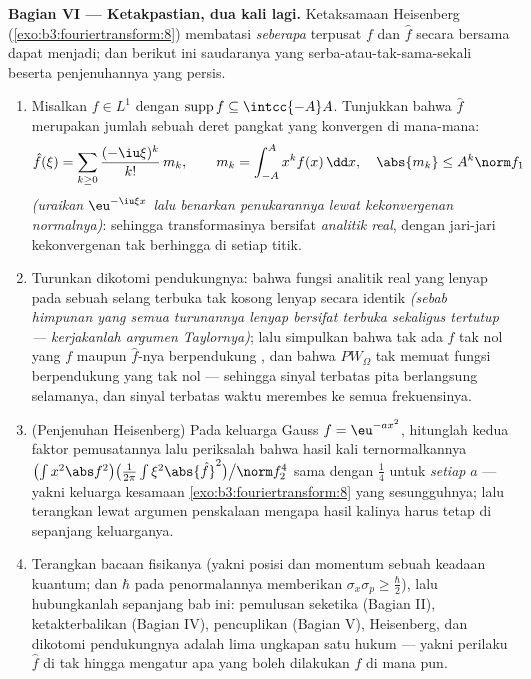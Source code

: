 \begin{problem}[{Soal akhir pekan --- $\partial_tu =
\partial^2_{xx}u$, yang diselesaikan sampai tuntas}]
\medskip
\noindent\textbf{Bagian VI --- Ketakpastian, dua kali lagi.}
Ketaksamaan Heisenberg (\cref{exo:b3:fouriertransform:8})
membatasi \emph{seberapa} terpusat $f$ dan $\hat f$ secara bersama
dapat menjadi; dan berikut ini saudaranya yang serba-atau-tak-sama-sekali beserta
penjenuhannya yang persis.
\begin{enumerate}[resume]
  \item Misalkan $f \in L^1$ dengan $\operatorname{supp}f \subseteq
        \intcc{-A}A$. Tunjukkan bahwa $\hat f$ merupakan jumlah sebuah
        deret pangkat yang konvergen di mana-mana:
        \[
        \hat f(\xi) = \sum_{k\geq0}\frac{(-\iu\xi)^k}{k!}
        \,m_k, \qquad m_k = \int_{-A}^{A}x^kf(x)\,\dd x,
        \quad \abs{m_k} \leq A^k\norm f_1
        \]
        \emph{(uraikan $\eu^{-\iu\xi x}$ lalu benarkan
        penukarannya lewat kekonvergenan normalnya)}: sehingga transformasinya
        bersifat \emph{analitik real}, dengan jari-jari kekonvergenan tak
        berhingga di setiap titik.
  \item Turunkan dikotomi pendukungnya: bahwa fungsi analitik real
        yang lenyap pada sebuah selang terbuka tak kosong
        lenyap secara identik \emph{(sebab himpunan yang semua
        turunannya lenyap bersifat terbuka sekaligus tertutup --- kerjakanlah
        argumen Taylornya)}; lalu simpulkan bahwa tak ada $f$ tak nol yang
        $f$ maupun $\hat f$-nya berpendukung , dan
        bahwa $PW_\Omega$ tak memuat fungsi berpendukung 
        yang tak nol --- sehingga sinyal terbatas pita berlangsung
        selamanya, dan sinyal terbatas waktu merembes ke semua
        frekuensinya.
  \item (Penjenuhan Heisenberg) Pada keluarga Gauss $f
        = \eu^{-ax^2}$, hitunglah kedua faktor pemusatannya
        lalu periksalah bahwa hasil kali ternormalkannya
        $\bigl(\int x^2\abs f^2\bigr)\bigl(\frac1{2\pi}\int
        \xi^2\abs{\hat f}^2\bigr)\big/\norm f_2^4$ sama dengan
        $\frac14$ untuk \emph{setiap} $a$ --- yakni keluarga kesamaan
        \cref{exo:b3:fouriertransform:8} yang sesungguhnya;
        lalu terangkan lewat argumen penskalaan mengapa hasil kalinya
        harus tetap di sepanjang keluarganya.
  \item Terangkan bacaan fisikanya (yakni  posisi dan momentum
        sebuah keadaan kuantum; dan $\hbar$ pada penormalannya memberikan
        $\sigma_x\sigma_p \geq
        \frac\hbar2$), lalu hubungkanlah sepanjang bab ini:
        pemulusan seketika (Bagian II), ketakterbalikan (Bagian
        IV), pencuplikan (Bagian V), Heisenberg, dan dikotomi
        pendukungnya adalah lima ungkapan satu hukum --- yakni
        perilaku $\hat f$ di tak hingga mengatur apa yang boleh
        dilakukan $f$ di mana pun.
\end{enumerate}


\end{problem}

